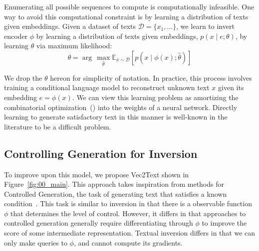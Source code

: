 \documentclass[11pt]{article}
\newcommand{\MethodName}{Vec2Text}
\begin{document}
Enumerating all possible sequences to compute  is computationally infeasible. One way to avoid this computational constraint is by learning a distribution of texts given embeddings. Given a dataset of texts $\mathcal{D} = \{x_1, \ldots \}$, we learn to invert encoder $\phi$ by learning a distribution of texts given embeddings, $p(x \mid e; \theta)$, by learning $\theta$ via maximum likelihood:
\[
\theta = \arg\,\max_{\hat{\theta}} \mathbb{E}_{x \sim \mathcal{D}} [ p(x \mid \phi(x); \hat{\theta}) ]
\]

\noindent We drop the $\theta$ hereon for simplicity of notation. In practice, this process involves training a conditional language model to reconstruct unknown text $x$ given its embedding $e = \phi(x)$. We can view this learning problem as amortizing the combinatorial optimization~() into the weights of a neural network.
Directly learning to generate satisfactory text in this manner is well-known in the literature to be a difficult problem.


\subsection{Controlling Generation for Inversion}
\label{sec:congen}

To improve upon this model, we propose \MethodName{} shown in Figure~\ref{fig:00_main}. This approach takes inspiration from methods for Controlled Generation, the task of generating text that satisfies a known condition~\cite{hu2018controlled, john2018disentangled, yang2021fudge}. This task is similar to inversion in that there is a observable function $\phi$ that determines the level of control.
However, it differs in that approaches to controlled generation \cite{dathathri2020pplm,li2022diffusionlm} generally require differentiating through $\phi$ to improve the score of some intermediate representation. Textual inversion differs in that we can only make queries to $\phi$, and cannot compute its gradients.

\end{document}
